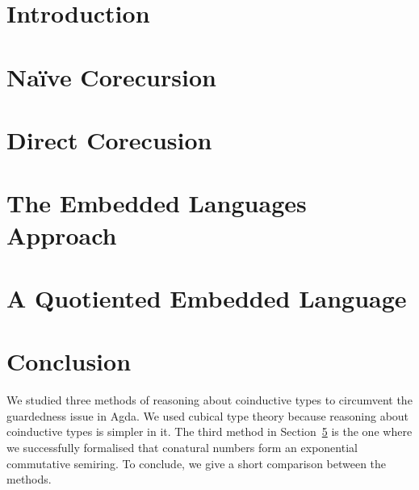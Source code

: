 \documentclass[sigplan, screen, natbib=false]{acmart}
\begin{document}

\maketitle

\section{Introduction}\label{sec:intro}


\section{Naïve Corecursion}\label{sec:problem}



\section{Direct Corecusion}\label{sec:direct}



\section{The Embedded Languages Approach}\label{sec:dsl}



\section{A Quotiented Embedded Language}\label{sec:quotiented}



\section{Conclusion}

We studied three methods of reasoning about coinductive types to circumvent the
guardedness issue in Agda. We used cubical type theory because reasoning about
coinductive types is simpler in it. The third method in
Section~\ref{sec:quotiented} is the one where we successfully formalised that
conatural numbers form an exponential commutative semiring. To conclude, we give
a short comparison between the methods.
\end{document}
